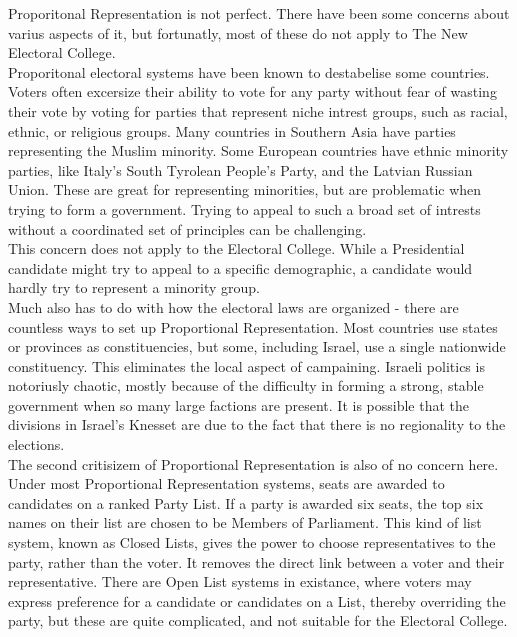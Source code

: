 \documentclass{article}
\begin{document}
    Proporitonal Representation is not perfect. There have been some concerns about varius aspects of it, but fortunatly, most of these do not apply to The New Electoral College.\\

    Proporitonal electoral systems have been known to destabelise some countries. Voters often excersize their ability to vote for any party without fear of wasting their vote by voting for parties that represent niche intrest groups, such as racial, ethnic, or religious groups. Many countries in Southern Asia have parties representing the Muslim minority. Some European countries have ethnic minority parties, like Italy's South Tyrolean People's Party, and the Latvian Russian Union. These are great for representing minorities, but are problematic when trying to form a government. Trying to appeal to such a broad set of intrests without a coordinated set of principles can be challenging.\\

    This concern does not apply to the Electoral College. While a Presidential candidate might try to appeal to a specific demographic, a candidate would hardly try to represent a minority group.\\

    Much also has to do with how the electoral laws are organized - there are countless ways to set up Proportional Representation. Most countries use states or provinces as constituencies, but some, including Israel, use a single nationwide constituency. This eliminates the local aspect of campaining. Israeli politics is notoriusly chaotic, mostly because of the difficulty in forming a strong, stable government when so many large factions are present. It is possible that the divisions in Israel's Knesset are due to the fact that there is no regionality to the elections.\\

    The second critisizem of Proportional Representation is also of no concern here. Under most Proportional Representation systems, seats are awarded to candidates on a ranked Party List. If a party is awarded six seats, the top six names on their list are chosen to be Members of Parliament. This kind of list system, known as Closed Lists, gives the power to choose representatives to the party, rather than the voter. It removes the direct link between a voter and their representative. There are Open List systems in existance, where voters may express preference for a candidate or candidates on a List, thereby overriding the party, but these are quite complicated, and not suitable for the Electoral College.\\
\end{document}
